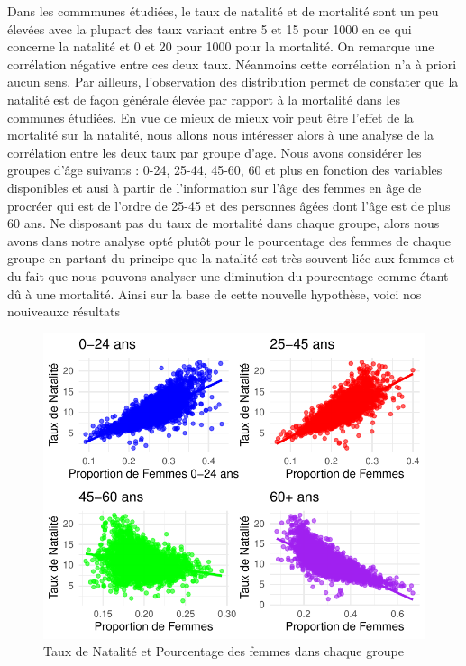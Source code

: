 \documentclass[
]{article}
\begin{document}
Dans les commmunes étudiées, le taux de natalité et de mortalité sont un
peu élevées avec la plupart des taux variant entre 5 et 15 pour 1000 en
ce qui concerne la natalité et 0 et 20 pour 1000 pour la mortalité. On
remarque une corrélation négative entre ces deux taux. Néanmoins cette
corrélation n'a à priori aucun sens. Par ailleurs, l'observation des
distribution permet de constater que la natalité est de façon générale
élevée par rapport à la mortalité dans les communes étudiées. En vue de
mieux de mieux voir peut être l'effet de la mortalité sur la natalité,
nous allons nous intéresser alors à une analyse de la corrélation entre
les deux taux par groupe d'age. Nous avons considérer les groupes d'âge
suivants : 0-24, 25-44, 45-60, 60 et plus en fonction des variables
disponibles et ausi à partir de l'information sur l'âge des femmes en
âge de procréer qui est de l'ordre de 25-45 et des personnes âgées dont
l'âge est de plus 60 ans. Ne disposant pas du taux de mortalité dans
chaque groupe, alors nous avons dans notre analyse opté plutôt pour le
pourcentage des femmes de chaque groupe en partant du principe que la
natalité est très souvent liée aux femmes et du fait que nous pouvons
analyser une diminution du pourcentage comme étant dû à une mortalité.
Ainsi sur la base de cette nouvelle hypothèse, voici nos nouiveauxc
résultats

\begin{figure}

{\centering \includegraphics{rapport_intermediaire_files/figure-latex/unnamed-chunk-18-1} 

}

\caption{Taux de Natalité et Pourcentage des femmes dans chaque groupe}\label{fig:unnamed-chunk-18}
\end{figure}
\end{document}
